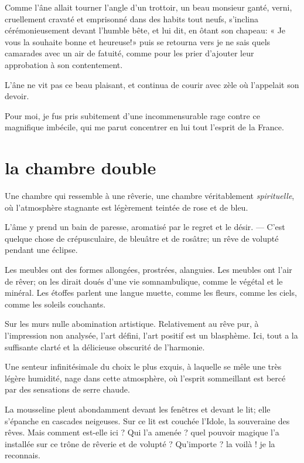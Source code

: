 Comme l’âne allait tourner l’angle
d’un trottoir, un beau monsieur ganté, verni,
cruellement cravaté et emprisonné dans des habits tout neufs,
s’inclina cérémonieusement devant
l’humble bête, et lui dit, en ôtant son chapeau: « Je
vous la souhaite bonne et heureuse!» puis se retourna vers je ne sais
quels camarades avec un air de fatuité, comme pour les prier
d’ajouter leur approbation à son contentement.

L’âne ne vit pas ce beau plaisant, et continua de
courir avec zèle où l’appelait son devoir.

Pour moi, je fus pris subitement d’une incommensurable
rage contre ce magnifique imbécile, qui me parut concentrer en lui tout
l’esprit de la France.


\quebra\section[La chambre double]{la chambre double }

Une chambre qui ressemble à une rêverie, une chambre véritablement
\textit{spirituelle}, où l’atmosphère stagnante est légèrement
teintée de rose et de bleu.

L’âme y prend un bain de paresse, aromatisé par le
regret et le désir. --- C’est quelque chose de
crépusculaire, de bleuâtre et de rosâtre; un rêve de volupté pendant
une éclipse.

Les meubles ont des formes allongées, prostrées, alanguies. Les meubles
ont l’air de rêver; on les dirait doués
d’une vie somnambulique, comme le végétal et le
minéral. Les étoffes parlent une langue muette, comme les fleurs, comme
les ciels, comme les soleils couchants.

Sur les murs nulle abomination artistique. Relativement au rêve pur, à
l’impression non analysée, l’art
défini, l’art positif est un blasphème. Ici, tout a la
suffisante clarté et la délicieuse obscurité de
l’harmonie.

Une senteur infinitésimale du choix le plus exquis, à laquelle se mêle
une très légère humidité, nage dans cette atmosphère, où
l’esprit sommeillant est bercé par des sensations de
serre chaude.

La mousseline pleut abondamment devant les fenêtres et devant le lit;
elle s’épanche en cascades neigeuses. Sur ce lit est
couchée l’Idole, la souveraine des rêves. Mais comment
est{}-elle ici ? Qui l’a amenée ? quel pouvoir magique
l’a installée sur ce trône de rêverie et de volupté ?
Qu’importe ? la voilà ! je la reconnais.

